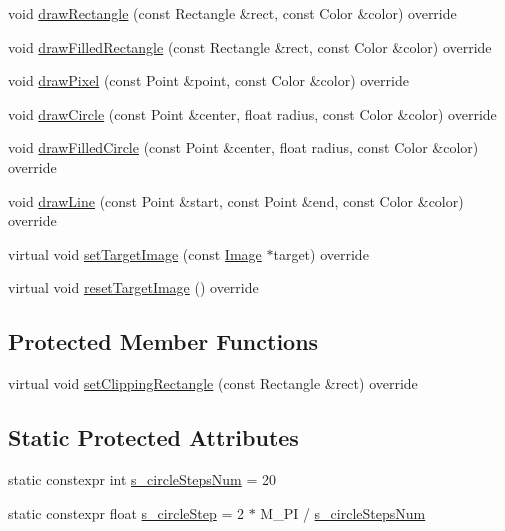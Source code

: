 \begin{DoxyCompactItemize}
void \mbox{\hyperlink{classagui_1_1_open_g_l_graphics_a88a6af03611b93169c197167c2c014fe}{draw\+Rectangle}} (const Rectangle \&rect, const Color \&color) override
\item 
void \mbox{\hyperlink{classagui_1_1_open_g_l_graphics_a9174e22c26308ae9902f29970a68b687}{draw\+Filled\+Rectangle}} (const Rectangle \&rect, const Color \&color) override
\item 
void \mbox{\hyperlink{classagui_1_1_open_g_l_graphics_a333364e89726e8f7248e050c3bb8ee5a}{draw\+Pixel}} (const Point \&point, const Color \&color) override
\item 
void \mbox{\hyperlink{classagui_1_1_open_g_l_graphics_ade9a5b35baddea11cb56e40676572c45}{draw\+Circle}} (const Point \&center, float radius, const Color \&color) override
\item 
void \mbox{\hyperlink{classagui_1_1_open_g_l_graphics_a7dd166776af1f0e8f85b35ec5e00bd64}{draw\+Filled\+Circle}} (const Point \&center, float radius, const Color \&color) override
\item 
void \mbox{\hyperlink{classagui_1_1_open_g_l_graphics_a4123aa29ef3c9610fc121f3e52cb5e60}{draw\+Line}} (const Point \&start, const Point \&end, const Color \&color) override
\item 
virtual void \mbox{\hyperlink{classagui_1_1_open_g_l_graphics_acb546631e5be32af2c3bac34b4159320}{set\+Target\+Image}} (const \mbox{\hyperlink{class_image}{Image}} $\ast$target) override
\item 
virtual void \mbox{\hyperlink{classagui_1_1_open_g_l_graphics_ab9203c356b807cdff090f23b94cc19fe}{reset\+Target\+Image}} () override
\end{DoxyCompactItemize}
\subsection*{Protected Member Functions}
\begin{DoxyCompactItemize}
\item 
virtual void \mbox{\hyperlink{classagui_1_1_open_g_l_graphics_adcd13d35b9590bfb0019b2a4dd53b692}{set\+Clipping\+Rectangle}} (const Rectangle \&rect) override
\end{DoxyCompactItemize}
\subsection*{Static Protected Attributes}
\begin{DoxyCompactItemize}
\item 
static constexpr int \mbox{\hyperlink{classagui_1_1_open_g_l_graphics_a54efd9b25aaa7c9652c6640d13e1f4dd}{s\+\_\+circle\+Steps\+Num}} = 20
\item 
static constexpr float \mbox{\hyperlink{classagui_1_1_open_g_l_graphics_aaca483f805bee0f62f04c6ffa0bf8c2b}{s\+\_\+circle\+Step}} = 2 $\ast$ M\+\_\+\+PI / \mbox{\hyperlink{classagui_1_1_open_g_l_graphics_a54efd9b25aaa7c9652c6640d13e1f4dd}{s\+\_\+circle\+Steps\+Num}}
\end{DoxyCompactItemize}


